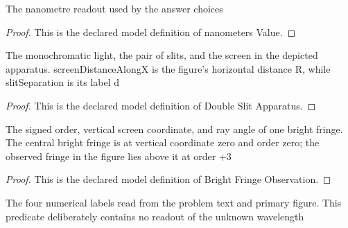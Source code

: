 \begin{definition}
  \label{def:physics:phyx-mini-0046:phyxminiproblems-problemphyxmini0046-nanometersvalue}
  The nanometre readout used by the answer choices
\end{definition}
\begin{proof}
  This is the declared model definition of nanometers Value.
\end{proof}
\begin{definition}
  \label{def:physics:phyx-mini-0046:phyxminiproblems-problemphyxmini0046-doubleslitapparatus}
  The monochromatic light, the pair of slits, and the screen in the depicted apparatus. screenDistanceAlongX is the figure's horizontal distance R, while slitSeparation is its label d
\end{definition}
\begin{proof}
  This is the declared model definition of Double Slit Apparatus.
\end{proof}
\begin{definition}
  \label{def:physics:phyx-mini-0046:phyxminiproblems-problemphyxmini0046-brightfringeobservation}
  The signed order, vertical screen coordinate, and ray angle of one bright fringe. The central bright fringe is at vertical coordinate zero and order zero; the observed fringe in the figure lies above it at order +3
\end{definition}
\begin{proof}
  This is the declared model definition of Bright Fringe Observation.
\end{proof}
\begin{definition}
  \label{def:physics:phyx-mini-0046:phyxminiproblems-problemphyxmini0046-hasstatedfigurereadouts}
  The four numerical labels read from the problem text and primary figure. This predicate deliberately contains no readout of the unknown wavelength
\end{definition}
